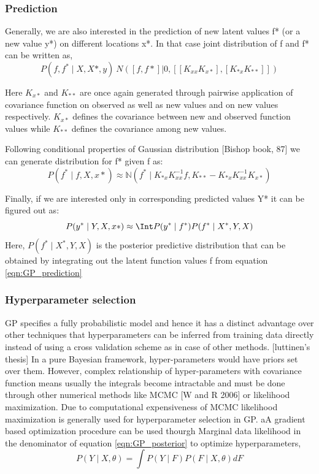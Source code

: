 \subsubsection{Prediction}
Generally, we are also interested in the prediction of new latent values f* (or a new value y*) on different locations x*. In that case joint distribution of f and f* can be written as,
$$P(f,f^* \mid X,X*,y) ~ N([f, f*] | 0, [[K_{xx} K_{x*}],[K_{*x} K_{**}]])$$

Here $K_{x*}$ and $K_{**}$ are once again generated through pairwise application of covariance function on observed as well as new values and on new values respectively. $K_{x*}$ defines the covariance between new and observed function values while $K_{**}$ defines the covariance among new values.

Following conditional properties of Gaussian distribution [Bishop book, 87] we can generate distribution for f* given f as:
\begin{equation}
    P(f^* \mid f, X, x*) \approx \mathbb{N}(f^* \mid K_{*x}K_{xx}^{-1}f, K_{**} - K_{*x}K_{xx}^{-1}K_{x*} )
    \label{eqn:GP_prediction}
\end{equation}	 

Finally, if we are interested only in corresponding predicted values Y* it can be figured out as:
\begin{equation}
    P(y^* \mid Y, X, x*) \approx \Int P(y^* \mid f^*)P(f^* \mid X^*,Y,X)
\end{equation}
Here, $P(f^* \mid X^*,Y,X)$ is the posterior predictive distribution that can be obtained by integrating out the latent function values f from equation \ref{eqn:GP_prediction}

\subsubsection{Hyperparameter selection}

GP specifies a fully probabilistic model and hence it has a distinct advantage over other techniques that hyperparameters can be inferred from training data directly instead of using a cross validation scheme as in case of other methods. [luttinen’s thesis]
In a pure Bayesian framework, hyper-parameters would have priors set over them. However, complex relationship of hyper-parameters with covariance function means usually the integrals become intractable and must be done through other numerical methods like MCMC [W and R 2006] or likelihood maximization. Due to computational expensiveness of MCMC likelihood maximization is generally used for hyperparameter selection in GP. aA gradient based optimization procedure can be used thourgh Marginal data likelihood in the denominator of equation \ref{eqn:GP_posterior} to optimize hyperparameters,
$$P(Y \mid X, \theta) = \int P(Y \mid F)P(F \mid X, \theta) dF $$

